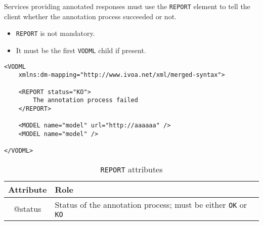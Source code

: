 Services providing annotated responses must use the \texttt{REPORT}  element to tell the client whether the annotation process succeeded or not.

\begin{itemize}
\item \texttt{REPORT} is not mandatory.
\item It must be the first \texttt{VODML} child if present.
\end{itemize}



\begin{lstlisting}[frame=single,caption={Example of a \texttt{REPORT} element},style=XML,basicstyle=\tiny]
<VODML
	xmlns:dm-mapping="http://www.ivoa.net/xml/merged-syntax">
	
	<REPORT status="KO">
	    The annotation process failed
	</REPORT>

	<MODEL name="model" url="http://aaaaaa" />
	<MODEL name="model" />
	
</VODML>
\end{lstlisting}

\begin{table}[!htbp]
  \small
  \centering
  \begin{tabulary}{\linewidth}{|c|J|}       
    \hline 
         \textbf{Attribute} & 
         \textbf {Role}\\
    \hline
    \hline  
         @status  & 
        Status of the annotation process; must be either \texttt{OK} or \texttt{KO} \\
    \hline 
  \end{tabulary}
  \caption{\texttt{REPORT} attributes} 
  \label{tbl:report-att}
\end{table}

